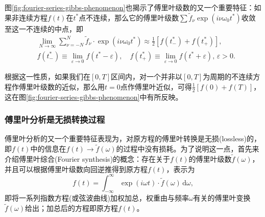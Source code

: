 图\ref{fig:fourier-series-gibbs-phenomenon}也揭示了傅里叶级数的又一个重要特征：如果非连续方程$f(t)$在$t^{*}$点不连续，那么它的傅里叶级数$\sum \tilde{f}_{\nu} \exp \left( i \nu \omega_{0} t^{*} \right)$收敛至这一不连续的中点，即
\begin{equation*}
\begin{split}
  & \lim_{N \rightarrow \infty}
  \sum_{\nu = - N}^{N}
  \tilde{f}_{\nu} \cdot \exp \left( i \nu \omega_{0} t^{*} \right)
  \approx \frac{1}{2}
  \left[
  f \left( t_{-}^{*}\right) + f \left( t_{+}^{*}\right)
  \right], \\
  & f \left( t_{-}^{*}\right) \equiv \lim_{\varepsilon \rightarrow 0} f \left( t^{*} - \varepsilon \right), \quad f \left( t_{+}^{*}\right) \equiv \lim_{\varepsilon \rightarrow 0} f \left( t^{*} + \varepsilon \right), \, \varepsilon > 0.
\end{split}
\end{equation*}

根据这一性质，如果我们在$[0,T]$区间内，对一个并非以$[0,T]$为周期的不连续方程作傅里叶级数的近似，那么用$t=0$点作傅里叶近似，可得$\frac{1}{2} \left[ f(0) + f(T)\right]$，这在图\ref{fig:fourier-series-gibbs-phenomenon}中有所反映。


\subsubsection{傅里叶分析是无损转换过程}
\label{sec:fourier-lossless}
傅里叶分析的又一个重要特征表现为，对原方程的傅里叶转换是无损(lossless)的，即$f(t)$中的信息在$f(t) \rightarrow \tilde{f}(\omega)$的过程中没有损耗。为了说明这一点，首先来介绍傅里叶综合(Fourier synthesis)的概念：存在关于$f(t)$的傅里叶级数$\tilde{f}(\omega)$，并且可以根据傅里叶级数向回逆推得到原方程$f(t)$，表示为
\begin{equation}
  \label{eq:fourier-series-synthesis}
  f(t) = \int_{-\infty}^{\infty} \exp \left( i \omega t \right) \cdot \tilde{f}(\omega) \, \mathrm{d} \omega,
\end{equation}
即将一系列指数方程(或弦波曲线)加权加总，权重由与频率$\omega$有关的傅里叶变换$\tilde{f}(\omega)$给出；加总后的方程即原方程$f(t)$。

